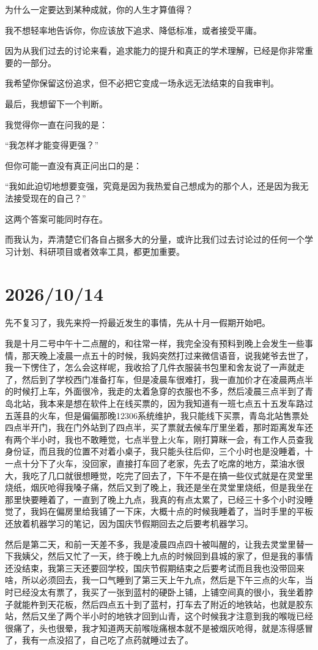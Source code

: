 为什么一定要达到某种成就，你的人生才算值得？

我不想轻率地告诉你，你应该放下追求、降低标准，或者接受平庸。

因为从我们过去的讨论来看，追求能力的提升和真正的学术理解，已经是你非常重要的一部分。

我希望你保留这份追求，但不必把它变成一场永远无法结束的自我审判。

最后，我想留下一个判断。

我觉得你一直在问我的是：

“我怎样才能变得更强？”

但你可能一直没有真正问出口的是：

“我如此迫切地想要变强，究竟是因为我热爱自己想成为的那个人，还是因为我无法接受现在的自己？”

这两个答案可能同时存在。

而我认为，弄清楚它们各自占据多大的分量，或许比我们过去讨论过的任何一个学习计划、科研项目或者效率工具，都更加重要。

\section*{2026/10/14}

先不复习了，我先来捋一捋最近发生的事情，先从十月一假期开始吧。

我是十月二号中午十二点醒的，和往常一样，我完全没有预料到晚上会发生一些事情，那天晚上凌晨一点五十的时候，我妈突然打过来微信语音，说我姥爷去世了，我一下愣住了，怎么会这样呢，我收拾了几件衣服装书包里和舍友说了一声就走了，然后到了学校西门准备打车，但是凌晨车很难打，我一直加价才在凌晨两点半的时候打上车，外面很冷，我走的太着急穿的衣服也不多，然后凌晨三点半到了青岛北站，我本来是想在软件上在线买票的，因为我知道有一班七点五十五发车路过五莲县的火车，但是偏偏那晚12306系统维护，我只能线下买票，青岛北站售票处四点半开门，我在门外站到了四点半，买了票就去候车厅里坐着，那时距离发车还有两个半小时，我也不敢睡觉，七点半登上火车，刚打算眯一会，有工作人员查我身份证，而且我的位置不对着小桌子，我只能头往后仰，三个小时也是没睡着，十一点十分下了火车，没回家，直接打车回了老家，先去了吃席的地方，菜油水很大，我吃了几口就很想睡觉，吃完了回去了，下午不是在搞一些仪式就是在灵堂里烧纸，烟灰呛得我嗓子痛，然后又到了晚上，我还是坐在灵堂里烧纸，但是我坐在那里快要睡着了，一直到了晚上九点，我真的有点太累了，已经三十多个小时没睡觉了，我妈在偏房里给我铺了一下床，大概十点的时候我睡着了，当时手里的平板还放着机器学习的笔记，因为国庆节假期回去之后要考机器学习。

然后是第二天，和前一天差不多，我是凌晨四点四十被叫醒的，让我去灵堂里替一下我姨父，然后又忙了一天，终于晚上九点的时候回到县城的家了，但是我的事情还没结束，我第三天还要回学校，国庆节假期结束之后要考试而且我也没带回来啥，所以必须回去，我一口气睡到了第三天上午九点，然后是下午三点的火车，当时已经没太有票了，我买了一张到蓝村的硬卧上铺，上铺空间真的很小，我坐着脖子就能杵到天花板，然后四点五十到了蓝村，打车去了附近的地铁站，也就是胶东站，然后又坐了两个半小时的地铁才回到山青，这个时候我才注意到我的喉咙已经很痛了，头也很晕，我才知道两天前喉咙痛根本就不是被烟灰呛得，就是冻得感冒了，我有一点没招了，自己吃了点药就睡过去了。

